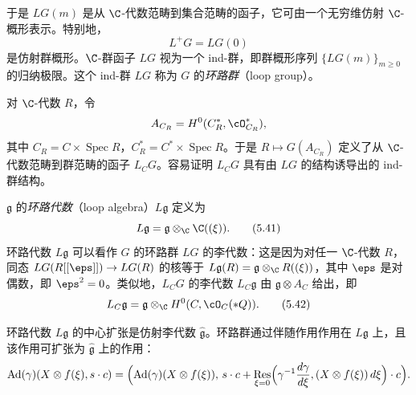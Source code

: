 
于是 $LG(m)$ 是从 $\C$-代数范畴到集合范畴的函子，它可由一个无穷维仿射 $\C$-概形表示。特别地，
\[
 L^+G=LG(0)
\]
是仿射群概形。$\C$-群函子 $LG$ 视为一个 ind-群，即群概形序列 $\{LG(m)\}_{m\ge 0}$ 的归纳极限。这个 ind-群 $LG$ 称为 $G$ 的\emph{环路群}（loop group）。



对 $\C$-代数 $R$，令
\[
 A_{C_R}=H^0(C_R^*,\cO^*_{C_R}),
\]
其中 $C_R=C\times\operatorname{Spec}R$，$C_R^*=C^*\times\operatorname{Spec}R$。于是 $R\mapsto G(A_{C_R})$ 定义了从 $\C$-代数范畴到群范畴的函子 $L_CG$。容易证明 $L_CG$ 具有由 $LG$ 的结构诱导出的 ind-群结构。


$\mathfrak g$ 的\emph{环路代数}（loop algebra）$L\mathfrak g$ 定义为
\begin{equation}
 L\mathfrak g=\mathfrak g\otimes_\C\C((\xi)). \tag{5.41}
\end{equation}
环路代数 $L\mathfrak g$ 可以看作 $G$ 的环路群 $LG$ 的李代数：这是因为对任一 $\C$-代数 $R$，同态 $LG(R[[\eps]])\to LG(R)$ 的核等于 $L\mathfrak g(R)=\mathfrak g\otimes_\C R((\xi))$，其中 $\eps$ 是对偶数，即 $\eps^2=0$。类似地，$L_CG$ 的李代数 $L_C\mathfrak g$ 由 $\mathfrak g\otimes A_C$ 给出，即
\begin{equation}
 L_C\mathfrak g=\mathfrak g\otimes_\C H^0(C,\cO_C(*Q)). \tag{5.42}
\end{equation}


环路代数 $L\mathfrak g$ 的中心扩张是仿射李代数 $\hat{\mathfrak g}$。环路群通过伴随作用作用在 $L\mathfrak g$ 上，且该作用可扩张为 $\hat{\mathfrak g}$ 上的作用：
\[
 \mathrm{Ad}(\gamma)(X\otimes f(\xi),s\cdot c)=\Bigl(\mathrm{Ad}(\gamma)(X\otimes f(\xi)),\,
 s\cdot c+\operatorname*{Res}_{\xi=0}\Bigl(\gamma^{-1}\frac{d\gamma}{d\xi},
 (X\otimes f(\xi))\,d\xi\Bigr)\cdot c\Bigr).
\]



